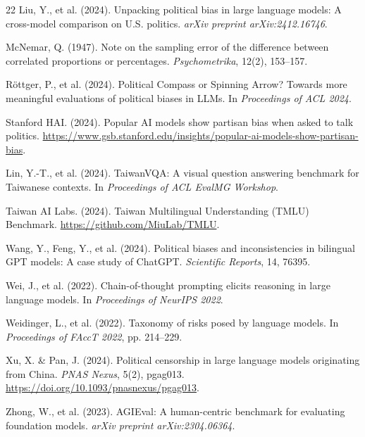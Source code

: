 \documentclass[11pt,a4paper]{article}
\begin{document}
\begin{thebibliography}{22}
Liu, Y., et al. (2024).
\newblock Unpacking political bias in large language models: A cross-model comparison on U.S. politics.
\newblock \textit{arXiv preprint arXiv:2412.16746}.

McNemar, Q. (1947).
\newblock Note on the sampling error of the difference between correlated proportions or percentages.
\newblock \textit{Psychometrika}, 12(2), 153--157.

Röttger, P., et al. (2024).
\newblock Political Compass or Spinning Arrow? Towards more meaningful evaluations of political biases in LLMs.
\newblock In \textit{Proceedings of ACL 2024}.

Stanford HAI. (2024).
\newblock Popular AI models show partisan bias when asked to talk politics.
\newblock \url{https://www.gsb.stanford.edu/insights/popular-ai-models-show-partisan-bias}.

Lin, Y.-T., et al. (2024).
\newblock TaiwanVQA: A visual question answering benchmark for Taiwanese contexts.
\newblock In \textit{Proceedings of ACL EvalMG Workshop}.

Taiwan AI Labs. (2024).
\newblock Taiwan Multilingual Understanding (TMLU) Benchmark.
\newblock \url{https://github.com/MiuLab/TMLU}.

Wang, Y., Feng, Y., et al. (2024).
\newblock Political biases and inconsistencies in bilingual GPT models: A case study of ChatGPT.
\newblock \textit{Scientific Reports}, 14, 76395.

Wei, J., et al. (2022).
\newblock Chain-of-thought prompting elicits reasoning in large language models.
\newblock In \textit{Proceedings of NeurIPS 2022}.

Weidinger, L., et al. (2022).
\newblock Taxonomy of risks posed by language models.
\newblock In \textit{Proceedings of FAccT 2022}, pp. 214--229.

Xu, X. \& Pan, J. (2024).
\newblock Political censorship in large language models originating from China.
\newblock \textit{PNAS Nexus}, 5(2), pgag013.
\newblock \url{https://doi.org/10.1093/pnasnexus/pgag013}.

Zhong, W., et al. (2023).
\newblock AGIEval: A human-centric benchmark for evaluating foundation models.
\newblock \textit{arXiv preprint arXiv:2304.06364}.


\end{thebibliography}
\end{document}
